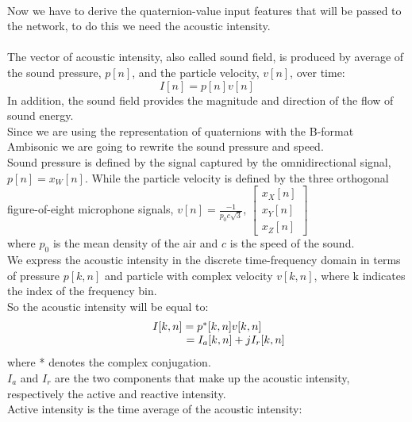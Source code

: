 \documentclass{article}
\begin{document}
    \\ Now we have to derive the quaternion-value input features that will be passed to the network, to do this we need the
    acoustic intensity.
    \\ \\ The vector of acoustic intensity, also called sound field, is produced by average of the sound pressure, $p[n]$, and
    the particle velocity, $v[n]$, over time:
    \begin{equation*}
        I[n]=p[n]v[n]
    \end{equation*}
    In addition, the sound field provides the magnitude and direction of the flow of sound energy.
    \\ Since we are using the representation of quaternions with the B-format Ambisonic we are going to rewrite the sound 
    pressure and speed.
    \\ Sound pressure is defined by the signal captured by the omnidirectional signal, $p[n] = x_W[n]$.
    While the particle velocity is defined by the three orthogonal figure-of-eight microphone signals, $v[n]= \frac{-1}{p_0c\sqrt{3}}$,
    $\begin{bmatrix}
            x_X[n] \\
            x_Y[n] \\
            x_Z[n]
        \end{bmatrix}
    $
    \\ where $p_0$ is the mean density of the air and $c$ is the speed of the sound.
    \\ We express the acoustic intensity in the discrete time-frequency domain in terms of pressure $p[k,n]$ and particle with complex
    velocity $v[k, n]$, where k indicates the index of the frequency bin.
    \\ So the acoustic intensity will be equal to:
    \begin{equation*}
        \begin{matrix}
            I[k,n] = p^*[k,n] v[k,n] \\
            \hspace{1.8cm} = I_a[k,n]+jI_r[k,n]
        \end{matrix}
    \end{equation*}
    where * denotes the complex conjugation.
    \\ $I_a$ and $I_r$ are the two components that make up the acoustic intensity, respectively the active and reactive intensity.
    \\ Active intensity is the time average of the acoustic intensity:
\end{document}
